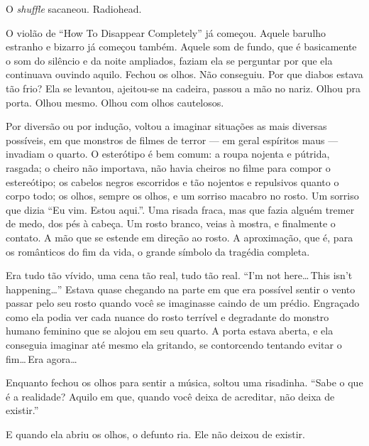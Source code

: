 O \emph{shuffle} sacaneou. Radiohead.

O violão de \foreignlanguage{english}{``How To Disappear Completely''} já começou. Aquele barulho estranho e bizarro já começou também. Aque\-le som de fundo, que é basicamente o som do silêncio e da noite ampliados, faziam ela se perguntar por que ela continuava ouvindo aquilo. Fechou os olhos. Não conseguiu. Por que diabos estava tão frio? Ela se levantou, ajeitou-se na cadeira, passou a mão no nariz. Olhou pra porta. Olhou mesmo. Olhou com olhos cautelosos.

Por diversão ou por indução, voltou a imaginar situações as mais diversas possíveis, em que monstros de filmes de terror --- em geral espíritos maus --- invadiam o quarto. O esterótipo é bem comum: a roupa nojenta e pútrida, rasgada; o cheiro não importava, não havia cheiros no filme para compor o estereótipo; os cabelos negros escorridos e tão nojentos e repulsivos quanto o corpo todo; os olhos, sempre os olhos, e um sorriso macabro no rosto. Um sorriso que dizia ``Eu vim. Estou aqui.''. Uma risada fraca, mas que fazia alguém tremer de medo, dos pés à cabeça. Um rosto branco, veias à mostra, e finalmente o contato. A mão que se estende em direção ao rosto. A aproximação, que é, para os românticos do fim da vida, o grande símbolo da tragédia completa.

Era tudo tão vívido, uma cena tão real, tudo tão real. \foreignlanguage{english}{``I'm not here\ldots\,This isn't happening\ldots''} Estava quase chegando na parte em que era possível sentir o vento passar pelo seu rosto quando você se imaginasse caindo de um prédio. Engraçado como ela podia ver cada nuance do rosto terrível e degradante do monstro humano feminino que se alojou em seu quarto. A porta estava aberta, e ela conseguia imaginar até mesmo ela gritando, se contorcendo tentando evitar o fim\ldots\,Era agora\ldots

Enquanto fechou os olhos para sentir a música, soltou uma risadinha. ``Sabe o que é a realidade? Aquilo em que, quando você deixa de acreditar, não deixa de existir.''

E quando ela abriu os olhos, o defunto ria. Ele não deixou de existir.
